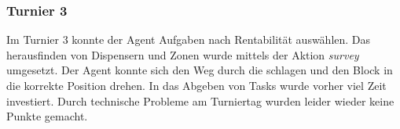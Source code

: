 %
%

\subsubsection{Turnier 3}
Im Turnier 3 konnte der Agent Aufgaben nach Rentabilität auswählen. Das herausfinden von Dispensern und Zonen wurde mittels der Aktion \emph{survey} umgesetzt. Der Agent konnte sich den Weg durch die \Obstacles schlagen und den Block in die korrekte Position drehen. In das Abgeben von Tasks wurde vorher viel Zeit investiert. Durch technische Probleme am Turniertag wurden leider wieder keine Punkte gemacht. 


%
%

